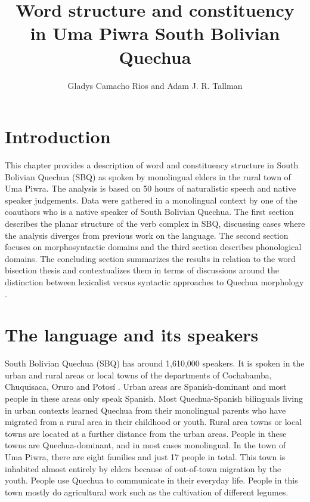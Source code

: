 \documentclass[output=paper]{langscibook}
\author{Gladys Camacho Rios\affiliation{State University of New York at Buffalo} and Adam J. R. Tallman\affiliation{Friedrich-Schiller-Universität Jena}}
\title{Word structure and constituency in Uma Piwra South Bolivian Quechua}
\begin{document}
\maketitle


\section{Introduction} %
\label{sbq:sec:introduction}

This chapter provides a description of word and constituency structure in South Bolivian Quechua (SBQ) as spoken by monolingual elders in the rural town of Uma Piwra. The analysis is based on 50 hours of naturalistic speech and native speaker judgements. Data were gathered in a monolingual context by one of the coauthors who is a native speaker of South Bolivian Quechua. The first section describes the planar structure of the verb complex in SBQ, discussing cases where the analysis diverges from previous work on the language. The second section focuses on morphosyntactic domains and the third section describes phonological domains. The concluding section summarizes the results in relation to the word bisection thesis and contextualizes them in terms of discussions around the distinction between lexicalist versus syntactic approaches to Quechua morphology \citep{weber1983relationship, muysken:1981}.


\section{The language and its speakers} %
\label{sbq:sec:language}

South Bolivian Quechua (SBQ) has around 1,610,000 speakers. It is spoken in the urban and rural areas or local towns of the departments of Cochabamba, Chuquisaca, Oruro and Potosí \citep{plazamartinez:2009}. Urban areas are Spanish-dominant and most people in these areas only speak Spanish. Most Quechua-Spanish bilinguals living in urban contexts learned Quechua from their monolingual parents who have migrated from a rural area in their childhood or youth. Rural area towns or local towns are located at a further distance from the urban areas. People in these towns are Quechua-dominant, and in most cases monolingual. In the town of Uma Piwra, there are eight families and just 17 people in total. This town is inhabited almost entirely by elders because of out-of-town migration by the youth. People use Quechua to communicate in their everyday life. People in this town mostly do agricultural work such as the cultivation of different legumes.
\end{document}
